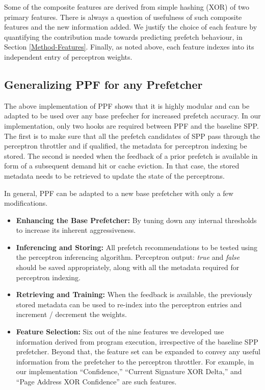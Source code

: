 Some of the composite features are derived from simple hashing (XOR) of two
primary features.  There is always a question of usefulness of such composite
features and the new information added.  We justify the choice of each feature
by quantifying the contribution made towards predicting prefetch behaviour, in
Section \ref{Method-Features}.  Finally, as noted above, each feature indexes
into its independent entry of perceptron weights.

\subsection{Generalizing PPF for any Prefetcher}
\label{Design-Generalizing}
The above implementation of PPF shows that it is highly modular and can be
adapted to be used over any base prefecher for increased prefetch accuracy.
In our implementation, only two hooks are required between PPF and the
baseline SPP. The first is to make sure that all the prefetch candidates of
SPP pass through the perceptron throttler and if qualified, the metadata for
perceptron indexing be stored. The second is needed when the feedback of a
prior prefetch is available in form of a subsequent demand hit or cache
eviction. In that case, the stored metadata needs to be retrieved to update
the state of the perceptrons.

In general, PPF can be adapted to a new base prefetcher with only a few modifications.
\begin{itemize}

\item \textbf{Enhancing the Base Prefetcher:} By tuning down any internal thresholds 
to increase its inherent aggressiveness. 

\item \textbf{Inferencing and Storing:} All prefetch recommendations to be
tested using the perceptron inferencing algorithm.  Perceptron output:
\textit{true} and \textit{false} should be saved appropriately, along with all
the metadata required for perceptron indexing.

\item \textbf{Retrieving and Training:} When the feedback is available, the
previously stored metadata can be used to re-index into the perceptron entries
and increment / decrement the weights.

\item \textbf{Feature Selection:} Six out of the nine features we developed
use information derived from program execution, irrespective of the baseline
SPP prefetcher. Beyond that, the feature set can be expanded to convey any
useful information from the prefetcher to the perceptron throttler.  For
example, in our implementation ``Confidence,'' ``Current Signature XOR Delta,''
and ``Page Address XOR Confidence'' are such features.

\end{itemize}

